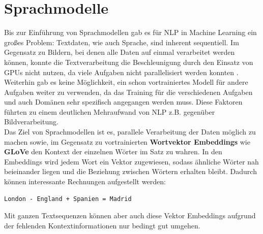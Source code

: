 \chapter{Sprachmodelle}
Bis zur Einf\"uhrung von Sprachmodellen gab es f\"ur NLP in Machine Learning ein gro{\ss}es Problem: Textdaten, wie auch Sprache, sind inherent sequentiell. Im Gegensatz zu Bildern, bei denen alle Daten auf einmal verarbeitet werden k\"onnen, konnte die Textverarbeitung die Beschleunigung durch den Einsatz von GPUs nicht nutzen, da viele Aufgaben nicht parallelisiert werden konnten \cite{attention}.\\ Weiterhin gab es keine M\"oglichkeit, ein schon vortrainiertes Modell f\"ur andere Aufgaben weiter zu verwenden, da das Training f\"ur die verschiedenen Aufgaben und auch Dom\"anen sehr spezifisch angegangen werden muss. Diese Faktoren f\"uhrten zu einem deutlichen Mehraufwand von NLP z.B. gegen\"uber Bildverarbeitung.\\
Das Ziel von Sprachmodellen ist es, parallele Verarbeitung der Daten m\"oglich zu machen sowie, im Gegensatz zu vortrainierten \textbf{Wortvektor Embeddings} wie \textbf{GLoVe} den Kontext der einzelnen W\"orter im Satz zu wahren. In den Embeddings wird jedem Wort ein Vektor zugewiesen, sodass \"ahnliche W\"orter nah beieinander liegen und die Beziehung zwischen W\"ortern erhalten bleibt. Dadurch k\"onnen interessante Rechnungen aufgestellt werden:
\begin{verbatim} 
London - England + Spanien = Madrid
\end{verbatim} 
Mit ganzen Textsequenzen k\"onnen aber auch diese Vektor Embeddings aufgrund der fehlenden Kontextinformationen nur bedingt gut umgehen.



